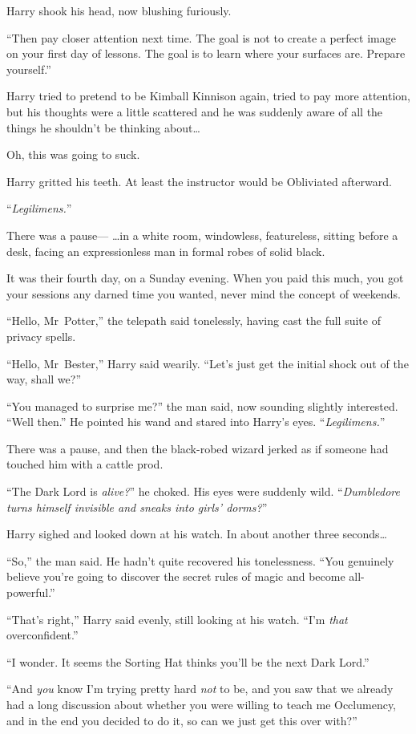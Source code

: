 Harry shook his head, now blushing furiously.

“Then pay closer attention next time. The goal is not to create a perfect image
on your first day of lessons. The goal is to learn where your surfaces are.
Prepare yourself.”

Harry tried to pretend to be Kimball Kinnison again, tried to pay more
attention, but his thoughts were a little scattered and he was suddenly aware
of all the things he shouldn’t be thinking about…

Oh, this was going to suck.

Harry gritted his teeth. At least the instructor would be Obliviated afterward.

“\emph{Legilimens.}”

There was a pause—
\later
…in a white room, windowless, featureless, sitting before a desk, facing
an expressionless man in formal robes of solid black.

It was their fourth day, on a Sunday evening. When you paid this much, you got
your sessions any darned time you wanted, never mind the concept of weekends.

“Hello, Mr~Potter,” the telepath said tonelessly, having cast the full suite
of privacy spells.

“Hello, Mr~Bester,” Harry said wearily. “Let’s just get the initial shock out
of the way, shall we?”

“You managed to surprise me?” the man said, now sounding slightly interested.
“Well then.” He pointed his wand and stared into Harry’s eyes.
“\emph{Legilimens.}”

There was a pause, and then the black-robed wizard jerked as if someone had
touched him with a cattle prod.

“The Dark Lord is \emph{alive?}” he choked. His eyes were suddenly wild.
“\emph{Dumbledore turns himself invisible and sneaks into girls’ dorms?}”

Harry sighed and looked down at his watch. In about another three
seconds…

“So,” the man said. He hadn’t quite recovered his tonelessness. “You genuinely
believe you’re going to discover the secret rules of magic and become
all-powerful.”

“That’s right,” Harry said evenly, still looking at his watch. “I’m \emph{that}
overconfident.”

“I wonder. It seems the Sorting Hat thinks you’ll be the next Dark Lord.”

“And \emph{you} know I’m trying pretty hard \emph{not} to be, and you saw that
we already had a long discussion about whether you were willing to teach me
Occlumency, and in the end you decided to do it, so can we just get this over
with?”

